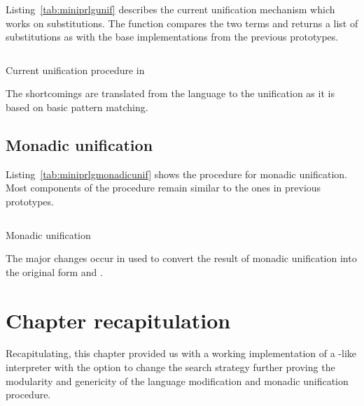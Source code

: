 \documentclass[thesis-solanki.tex]{files}
\begin{document}
Listing~\ref{tab:miniprlgunif} describes the current unification mechanism which works on substitutions. The 
 function compares the two terms and returns a list of substitutions as with the base implementations from
the previous prototypes.

\begin{code-list}[H]
\begin{singlespace}
  \inputminted[linenos, firstline=67, lastline=95]{haskell}{haskell-proto3-pentyl-skater.hs}
\end{singlespace}
\caption{Current unification procedure in  \cite{website:mini-prolog-hugs98}}
\label{tab:miniprlgunif}
\end{code-list}

The shortcomings are translated from the language to the unification as it is based on basic pattern matching.

\subsection{Monadic unification}
Listing~\ref{tab:miniprlgmonadicunif} shows the procedure for monadic unification. Most components of the procedure remain similar to the ones
in previous prototypes.
\begin{code-list}[H]
\begin{singlespace}
  \inputminted[linenos, firstline=1, lastline=42]{haskell}{haskell-proto3-bevy-icebox.hs}
\end{singlespace}
\caption{Monadic unification}
\label{tab:miniprlgmonadicunif}
\end{code-list}

The major changes occur in  used to convert the result of monadic unification into the original 
 form and .


\section{Chapter recapitulation}
Recapitulating, this chapter provided us with a working implementation of a -like interpreter with the option to change
the search strategy further proving the modularity and genericity of the language modification and monadic unification procedure.
\end{document}
